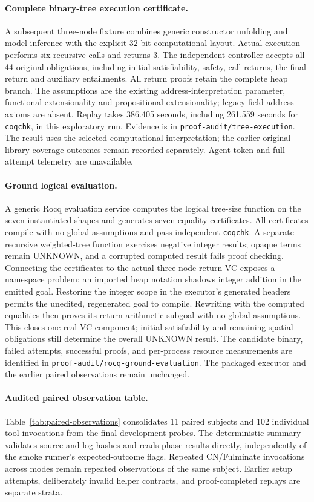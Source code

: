 \paragraph{Complete binary-tree execution certificate.}
A subsequent three-node fixture combines generic constructor unfolding and
model inference with the explicit 32-bit computational layout. Actual execution
performs six recursive calls and returns 3. The independent controller accepts
all 44 original obligations, including initial satisfiability, safety, call
returns, the final return and auxiliary entailments. All return proofs retain
the complete heap branch. The assumptions are the existing address-interpretation
parameter, functional extensionality and propositional extensionality; legacy
field-address axioms are absent. Replay takes 386.405 seconds, including
261.559 seconds for \texttt{coqchk}, in this exploratory run. Evidence is in
\texttt{proof-audit/tree-execution}. The result uses the selected computational
interpretation; the earlier original-library coverage outcomes remain recorded
separately. Agent token and full attempt telemetry are unavailable.

\paragraph{Ground logical evaluation.}
A generic Rocq evaluation service computes the logical tree-size function on
the seven instantiated shapes and generates seven equality certificates.
All certificates compile with no global assumptions and pass independent
\texttt{coqchk}. A separate recursive weighted-tree function exercises negative
integer results; opaque terms remain UNKNOWN, and a corrupted computed result
fails proof checking. Connecting the certificates to the actual three-node
return VC exposes a namespace problem: an imported heap notation shadows
integer addition in the emitted goal. Restoring the integer scope in the
executor's generated headers permits the unedited, regenerated goal to compile.
Rewriting with the computed equalities then proves its return-arithmetic
subgoal with no global assumptions. This closes one real VC component;
initial satisfiability and remaining spatial obligations still determine the
overall UNKNOWN result. The candidate binary, failed attempts, successful
proofs, and per-process resource measurements are identified in
\texttt{proof-audit/rocq-ground-evaluation}. The packaged executor and the
earlier paired observations remain unchanged.

\paragraph{Audited paired observation table.}
Table~\ref{tab:paired-observations} consolidates 11 paired subjects and 102
individual tool invocations from the final development probes. The deterministic
summary validates source and log hashes and reads \tespec{} phase results
directly, independently of the smoke runner's expected-outcome flags. Repeated
CN/Fulminate invocations across \tespec{} modes remain repeated observations
of the same subject. Earlier setup attempts, deliberately invalid helper
contracts, and proof-completed replays are separate strata.



